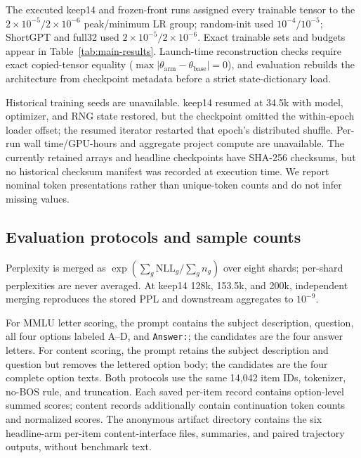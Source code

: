 The executed keep14 and frozen-front runs assigned every trainable tensor to
the $2\times10^{-5}/2\times10^{-6}$ peak/minimum LR group; random-init used
$10^{-4}/10^{-5}$; ShortGPT and full32 used
$2\times10^{-5}/2\times10^{-6}$. Exact trainable sets and budgets appear in
Table~\ref{tab:main-results}. Launch-time reconstruction checks require exact
copied-tensor equality ($\max|\theta_{\mathrm{arm}}-\theta_{\mathrm{base}}|=0$),
and evaluation rebuilds the architecture from checkpoint metadata before a
strict state-dictionary load.

Historical training seeds are unavailable. keep14 resumed at 34.5k with model,
optimizer, and RNG state restored, but the checkpoint omitted the within-epoch
loader offset; the resumed iterator restarted that epoch's distributed shuffle.
Per-run wall time/GPU-hours and aggregate project compute are unavailable.
The currently retained arrays and headline checkpoints have SHA-256 checksums,
but no historical checksum manifest was recorded at execution time. We report nominal token presentations rather than unique-token counts
and do not infer missing values.

\subsection{Evaluation protocols and sample counts}


Perplexity is merged as
$\exp(\sum_g\mathrm{NLL}_g/\sum_g n_g)$ over eight shards; per-shard
perplexities are never averaged. At keep14 128k, 153.5k, and 200k, independent
merging reproduces the stored PPL and downstream aggregates to $10^{-9}$.

For MMLU letter scoring, the prompt contains the subject description, question,
all four options labeled A--D, and \texttt{Answer:}; the candidates are the
four answer letters. For content scoring, the prompt retains the subject
description and question but removes the lettered option body; the candidates
are the four complete option texts. Both protocols use the same 14,042 item IDs,
tokenizer, no-BOS rule, and truncation. Each saved per-item record contains
option-level summed scores; content records additionally contain continuation
token counts and normalized scores. The anonymous artifact directory contains
the six headline-arm per-item content-interface files, summaries, and paired
trajectory outputs, without benchmark text.

